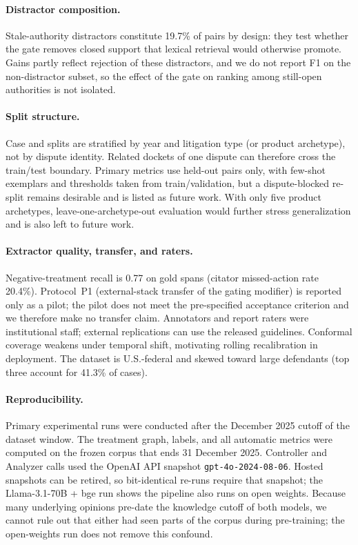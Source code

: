 \paragraph{Distractor composition.}
Stale-authority distractors constitute 19.7\% of \plre{} pairs by design: they test whether the gate removes closed support that lexical retrieval would otherwise promote.
Gains partly reflect rejection of these distractors, and we do not report F1 on the non-distractor subset, so the effect of the gate on ranking among still-open authorities is not isolated.

\paragraph{Split structure.}
Case and \plre{} splits are stratified by year and litigation type (or product archetype), not by dispute identity.
Related dockets of one dispute can therefore cross the train/test boundary.
Primary \plre{} metrics use held-out pairs only, with few-shot exemplars and thresholds taken from train/validation, but a dispute-blocked re-split remains desirable and is listed as future work.
With only five product archetypes, leave-one-archetype-out evaluation would further stress generalization and is also left to future work.

\paragraph{Extractor quality, transfer, and raters.}
Negative-treatment recall is 0.77 on gold spans (citator missed-action rate 20.4\%).
Protocol~P1 (external-stack transfer of the gating modifier) is reported only as a pilot; the pilot does not meet the pre-specified acceptance criterion and we therefore make no transfer claim.
Annotators and report raters were institutional staff; external replications can use the released guidelines.
Conformal coverage weakens under temporal shift, motivating rolling recalibration in deployment.
The dataset is U.S.-federal and skewed toward large defendants (top three account for 41.3\% of cases).

\paragraph{Reproducibility.}
Primary experimental runs were conducted after the December 2025 cutoff of the dataset window.
The treatment graph, \plre{} labels, and all automatic metrics were computed on the frozen corpus that ends 31 December 2025.
Controller and Analyzer calls used the OpenAI API snapshot \texttt{gpt-4o-2024-08-06}.
Hosted snapshots can be retired, so bit-identical re-runs require that snapshot; the Llama-3.1-70B + bge run shows the pipeline also runs on open weights.
Because many underlying opinions pre-date the knowledge cutoff of both models, we cannot rule out that either had seen parts of the corpus during pre-training; the open-weights run does not remove this confound.

